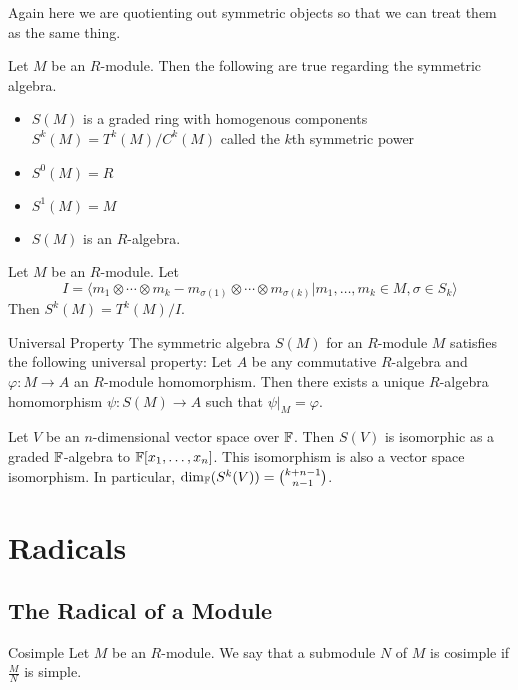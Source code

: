 \documentclass[a4paper]{article}
\begin{document}
Again here we are quotienting out symmetric objects so that we can treat them as the same thing. 

\begin{prp}{}{} Let $M$ be an $R$-module. Then the following are true regarding the symmetric algebra. 
\begin{itemize}
\item $S(M)$ is a graded ring with homogenous components $S^k(M)=T^k(M)/C^k(M)$ called the $k$th symmetric power
\item $S^0(M)=R$
\item $S^1(M)=M$
\item $S(M)$ is an $R$-algebra. 
\end{itemize}
\end{prp}

\begin{thm}{}{} Let $M$ be an $R$-module. Let $$I=\langle m_1\otimes\cdots\otimes m_k-m_{\sigma(1)}\otimes\cdots\otimes m_{\sigma(k)}|m_1,\dots,m_k\in M, \sigma\in S_k\rangle$$ Then $S^k(M)=T^k(M)/I$. 
\end{thm}

\begin{thm}{Universal Property}{} The symmetric algebra $S(M)$ for an $R$-module $M$ satisfies the following universal property: Let $A$ be any commutative $R$-algebra and $\varphi:M\to A$ an $R$-module homomorphism. Then there exists a unique $R$-algebra homomorphism $\psi:S(M)\to A$ such that $\psi|_M=\varphi$. 
\end{thm}

\begin{crl}{}{} Let $V$ be an $n$-dimensional vector space over $\mathbb{F}$. Then $S(V)$ is isomorphic as a graded $\mathbb{F}$-algebra to $\mathbb{F}[x_1,\dots,x_n]$. This isomorphism is also a vector space isomorphism. In particular, $\dim_{\mathbb{F}}(S^k(V))=\binom{k+n-1}{n-1}$. 
\end{crl}

\pagebreak
\section{Radicals}
\subsection{The Radical of a Module}
\begin{defn}{Cosimple}{} Let $M$ be an $R$-module. We say that a submodule $N$ of $M$ is cosimple if $\frac{M}{N}$ is simple. 
\end{defn}
\end{document}
